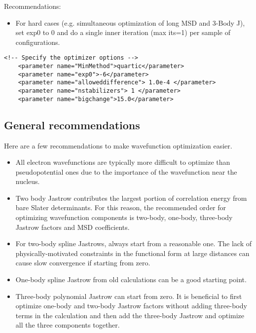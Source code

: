 Recommendations:
\begin{itemize}
  \item{For hard cases (e.g. simultaneous optimization of long MSD and 3-Body J), set exp0
to 0 and do a single inner iteration (max its=1) per sample of configurations.}
\end{itemize}

\begin{lstlisting}[style=QMCPXML]
    <!-- Specify the optimizer options -->
    <parameter name="MinMethod">quartic</parameter>
    <parameter name="exp0">-6</parameter>
    <parameter name="alloweddifference"> 1.0e-4 </parameter>
    <parameter name="nstabilizers"> 1 </parameter>
    <parameter name="bigchange">15.0</parameter>
\end{lstlisting}

\subsection{General recommendations}
Here are a few recommendations to make wavefunction optimization easier.
\begin{itemize}
\item All electron wavefunctions are typically more difficult to optimize than pseudopotential ones due to the importance of the wavefunction near the nucleus.
\item Two body Jastrow contributes the largest portion of correlation energy from bare Slater determinants. For this reason, the recommended order for optimizing wavefunction components is two-body, one-body, three-body Jastrow factors and MSD coefficients.
\item For two-body spline Jastrows, always start from a reasonable one. The lack of physically-motivated constraints in the functional form at large distances can cause slow convergence if starting from zero. 
\item One-body spline Jastrow from old calculations can be a good starting point.
\item Three-body polynomial Jastrow can start from zero. It is beneficial to first optimize one-body and two-body Jastrow factors without adding three-body terms in the calculation and then add the three-body Jastrow and optimize all the three components together.
\end{itemize}


